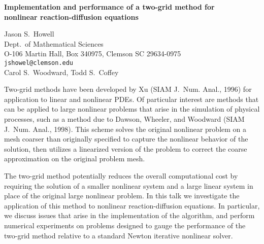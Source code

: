 \documentclass{report}
\begin{document}

\begin{center}
{\large
{\bf Implementation and performance of a two-grid method for \\
	nonlinear reaction-diffusion equations}}

	Jason S.~Howell \\
	Dept.~of Mathematical Sciences \\
	O-106 Martin Hall, Box 340975, Clemson SC 29634-0975 \\
	{\tt jshowel@clemson.edu} \\
	Carol S.~Woodward, Todd S.~Coffey
\end{center}
Two-grid methods have been developed by Xu (SIAM J.~Num.
Anal., 1996) for application to linear and nonlinear PDEs. Of
particular interest are methods that can be applied to large
nonlinear problems that arise in the simulation of physical
processes, such as a method due to Dawson, Wheeler, and
Woodward (SIAM J.~Num. Anal., 1998). This scheme solves the
original nonlinear problem on a mesh coarser than originally
specified to capture the nonlinear behavior of the solution,
then utilizes a linearized version of the problem to correct
the coarse approximation on the original problem mesh.

The
two-grid method potentially reduces the overall
computational cost by requiring the solution of a smaller
nonlinear system and a large linear system in place of the
original large nonlinear problem. In this talk we
investigate the application of this method to nonlinear
reaction-diffusion equations. In particular, we discuss
issues that arise in the implementation of the algorithm,
and perform numerical experiments on problems designed to
gauge the performance of the two-grid method relative to a
standard Newton iterative nonlinear solver.



\end{document}
